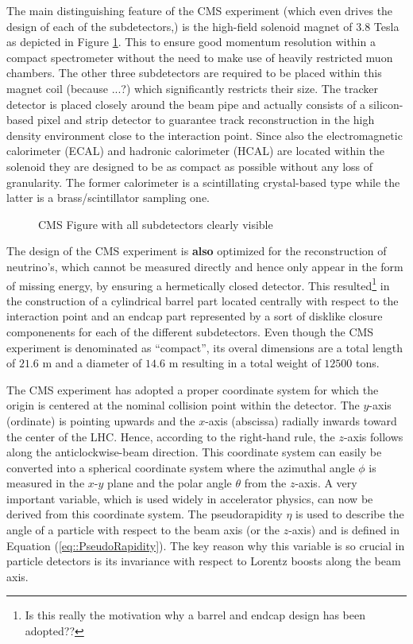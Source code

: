 The main distinguishing feature of the CMS experiment (which even drives the design of each of the subdetectors,) is the high-field solenoid magnet of $3.8$ Tesla as depicted in Figure \ref{fig::CMSFig}. This to ensure good momentum resolution within a compact spectrometer without the need to make use of heavily restricted muon chambers. The other three subdetectors are required to be placed within this magnet coil (because ...?) which significantly restricts their size. The tracker detector is placed closely around the beam pipe and actually consists of a silicon-based pixel and strip detector to guarantee track reconstruction in the high density environment close to the interaction point. Since also the electromagnetic calorimeter (ECAL) and hadronic calorimeter (HCAL) are located within the solenoid they are designed to be as compact as possible without any loss of granularity. The former calorimeter is a scintillating crystal-based type while the latter is a brass/scintillator sampling one.
\begin{figure}[h!t]
 \centering
 \caption{CMS Figure with all subdetectors clearly visible} \label{fig::CMSFig}
\end{figure}

The design of the CMS experiment is \textbf{also} optimized for the reconstruction of neutrino's, which cannot be measured directly and hence only appear in the form of missing energy, by ensuring a hermetically closed detector. This resulted\footnote{Is this really the motivation why a barrel and endcap design has been adopted??} in the construction of a cylindrical barrel part located centrally with respect to the interaction point and an endcap part represented by a sort of disklike closure componenents for each of the different subdetectors.
Even though the CMS experiment is denominated as ``compact'', its overal dimensions are a total length of $21.6$ m and a diameter of $14.6$ m resulting in a total weight of $12500$ tons.

The CMS experiment has adopted a proper coordinate system for which the origin is centered at the nominal collision point within the detector. The $y$-axis (ordinate) is pointing upwards and the $x$-axis (abscissa) radially inwards toward the center of the LHC. Hence, according to the right-hand rule, the $z$-axis follows along the anticlockwise-beam direction. This coordinate system can easily be converted into a spherical coordinate system where the azimuthal angle $\phi$ is measured in the $x$-$y$ plane and the polar angle $\theta$ from the $z$-axis. 
A very important variable, which is used widely in accelerator physics, can now be derived from this coordinate system. The pseudorapidity $\eta$ is used to describe the angle of a particle with respect to the beam axis (or the $z$-axis) and is defined in Equation (\ref{eq::PseudoRapidity}). The key reason why this variable is so crucial in particle detectors is its invariance with respect to Lorentz boosts along the beam axis.

